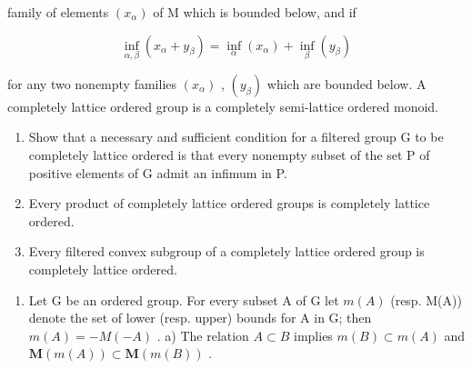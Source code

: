 family of elements \((x_{\alpha})\) of M which is bounded below, and if

\[
\inf _ {\alpha , \beta} (x _ {\alpha} + y _ {\beta}) = \inf _ {\alpha} (x _ {\alpha}) + \inf _ {\beta} (y _ {\beta})
\]

for any two nonempty families \((x_{\alpha})\) , \((y_{\beta})\) which are bounded below. A completely lattice ordered group is a completely semi-lattice ordered monoid.

\begin{enumerate}
\def\labelenumi{\alph{enumi})}
\item
  Show that a necessary and sufficient condition for a filtered group G to be completely lattice ordered is that every nonempty subset of the set P of positive elements of G admit an infimum in P.
\item
  Every product of completely lattice ordered groups is completely lattice ordered.
\item
  Every filtered convex subgroup of a completely lattice ordered group is completely lattice ordered.
\end{enumerate}

\begin{enumerate}
\def\labelenumi{\arabic{enumi})}
\setcounter{enumi}{29}
\tightlist
\item
  Let G be an ordered group. For every subset A of G let \(m(A)\) (resp. M(A)) denote the set of lower (resp. upper) bounds for A in G; then \(m(A) = -M(-A)\) . a) The relation \(A \subset B\) implies \(m(B) \subset m(A)\) and \(\mathbf{M}(m(A)) \subset \mathbf{M}(m(B))\) .
\end{enumerate}

